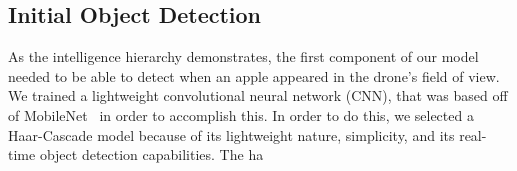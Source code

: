 \subsection{Initial Object Detection}
As the intelligence hierarchy demonstrates, the first component of our model needed to be able to detect when an apple appeared in the drone's field of view. 
We trained a lightweight convolutional neural network (CNN), that was based off of MobileNet~\cite{Sandler2018, } in order to accomplish this. 
In order to do this, we selected a Haar-Cascade model because of its lightweight nature, simplicity, and its real-time object detection capabilities. The ha